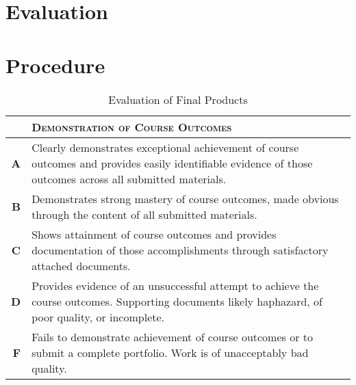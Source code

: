 \documentclass[12pt,oneside]{amsart}	%
\begin{document}

\section{Evaluation} %
\label{sec:evaluation}


\section{Procedure} %
	\label{sec:procedure}


\begin{table}[b]
	\caption{Evaluation of Final Products}\label{tab:rubric}
\begin{tabulary}{\textwidth}{rL}
	\toprule  & \textbf{\textsc{Demonstration of Course Outcomes}} \\
\midrule	\textbf{A} & Clearly demonstrates exceptional achievement of course outcomes and provides easily identifiable evidence of those outcomes across all submitted materials. \\
\midrule	\textbf{B} & Demonstrates strong mastery of course outcomes, made obvious through the content of all submitted materials. \\
\midrule	\textbf{C} & Shows attainment of course outcomes and provides documentation of those accomplishments through satisfactory attached documents. \\
\midrule	\textbf{D} & Provides evidence of an unsuccessful attempt to achieve the course outcomes. Supporting documents likely haphazard, of poor quality, or incomplete. \\
\midrule	\textbf{F} & Fails to demonstrate achievement of course outcomes or to submit a complete portfolio. Work is of unacceptably bad quality. \\
	\bottomrule
\end{tabulary}
\end{table}
\end{document}
